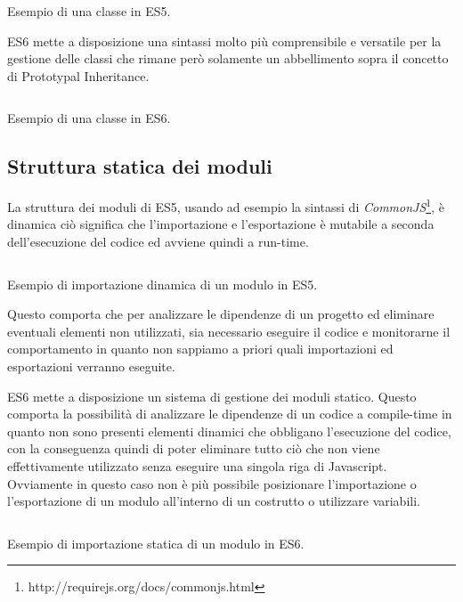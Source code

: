 \begin{listing}[ht]
\inputminted{Javascript}{sources/examplePrototypeInheritanceES5.js}
\caption{Esempio di una classe in ES5.}
\label{examplePrototypeInheritanceES5}
\end{listing}

\noindent
ES6 mette a disposizione una sintassi molto più comprensibile e versatile per la gestione delle classi che rimane però solamente un abbellimento sopra il concetto di Prototypal Inheritance. 

\begin{listing}[ht]
\inputminted{Javascript}{sources/exampleClassES6.js}
\caption{Esempio di una classe in ES6.}
\label{exampleClassES6}
\end{listing}

\subsection{Struttura statica dei moduli}
La struttura dei moduli di ES5, usando ad esempio la sintassi di \textit{CommonJS}\footnote{http://requirejs.org/docs/commonjs.html}, è dinamica ciò significa che l'importazione e l'esportazione è mutabile a seconda dell'esecuzione del codice ed avviene quindi a run-time. 

\begin{listing}[ht]
\inputminted{Javascript}{sources/exampleDynamicImportES5.js}
\caption{Esempio di importazione dinamica di un modulo in ES5.} 
\label{exampleDynamicImportES5}
\end{listing}

\noindent
Questo comporta che per analizzare le dipendenze di un progetto ed eliminare eventuali elementi non utilizzati, sia necessario eseguire il codice e monitorarne il comportamento in quanto non sappiamo a priori quali importazioni ed esportazioni verranno eseguite.

ES6 mette a disposizione un sistema di gestione dei moduli statico. Questo comporta la possibilità di analizzare le dipendenze di un codice a compile-time in quanto non sono presenti elementi dinamici che obbligano l'esecuzione del codice, con la conseguenza quindi di poter eliminare tutto ciò che non viene effettivamente utilizzato senza eseguire una singola riga di Javascript.
Ovviamente in questo caso non è più possibile posizionare l'importazione o l'esportazione di un modulo all'interno di un costrutto o utilizzare variabili.

\begin{listing}[ht]
\inputminted{Javascript}{sources/exampleImportExportES6.js}
\caption{Esempio di importazione statica di un modulo in ES6.} 
\label{exampleImportExportES6} 
\end{listing}


